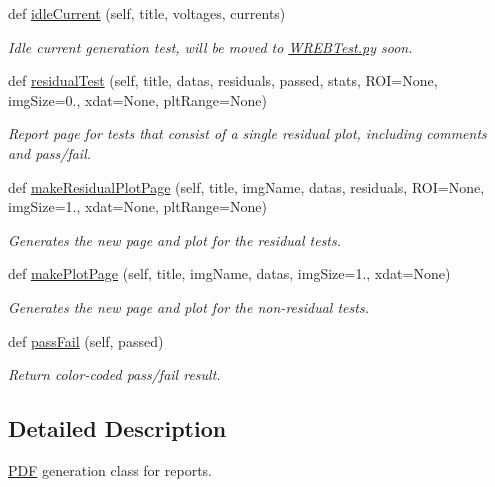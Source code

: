 \begin{DoxyCompactItemize}
def \hyperlink{classpdf_gen_w_r_e_b_1_1_p_d_f_a0c03db1c6bbb6d9de9fec314cf845cbb}{idle\+Current} (self, title, voltages, currents)
\begin{DoxyCompactList}\small\item\em Idle current generation test, will be moved to \hyperlink{_w_r_e_b_test_8py}{W\+R\+E\+B\+Test.\+py} soon. \end{DoxyCompactList}\item 
def \hyperlink{classpdf_gen_w_r_e_b_1_1_p_d_f_ae508c11aef02aa49d0e846a03b71abf2}{residual\+Test} (self, title, datas, residuals, passed, stats, R\+OI=None, img\+Size=0., xdat=None, plt\+Range=None)
\begin{DoxyCompactList}\small\item\em Report page for tests that consist of a single residual plot, including comments and pass/fail. \end{DoxyCompactList}\item 
def \hyperlink{classpdf_gen_w_r_e_b_1_1_p_d_f_a6fa66ac0799cc7bd37698f30f0136931}{make\+Residual\+Plot\+Page} (self, title, img\+Name, datas, residuals, R\+OI=None, img\+Size=1., xdat=None, plt\+Range=None)
\begin{DoxyCompactList}\small\item\em Generates the new page and plot for the residual tests. \end{DoxyCompactList}\item 
def \hyperlink{classpdf_gen_w_r_e_b_1_1_p_d_f_a6d5d3b21e55356e95a2c73d2e086620c}{make\+Plot\+Page} (self, title, img\+Name, datas, img\+Size=1., xdat=None)
\begin{DoxyCompactList}\small\item\em Generates the new page and plot for the non-\/residual tests. \end{DoxyCompactList}\item 
def \hyperlink{classpdf_gen_w_r_e_b_1_1_p_d_f_ab247acf933388e099f79ae0213f72972}{pass\+Fail} (self, passed)
\begin{DoxyCompactList}\small\item\em Return color-\/coded pass/fail result. \end{DoxyCompactList}\end{DoxyCompactItemize}


\subsection{Detailed Description}
\hyperlink{classpdf_gen_w_r_e_b_1_1_p_d_f}{P\+DF} generation class for reports. 

